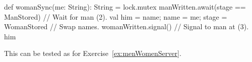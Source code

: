 \begin{answerI}
\begin{scala}
{  def womanSync(me: String): String = lock.mutex{
    manWritten.await(stage == ManStored) // Wait for man (2).
    val him = name; name = me; stage = WomanStored // Swap names.
    womanWritten.signal() // Signal to man at (3).
    him
  }
}
\end{scala}

This can be tested as for Exercise~\ref{ex:menWomenServer}.
\end{answerI}
